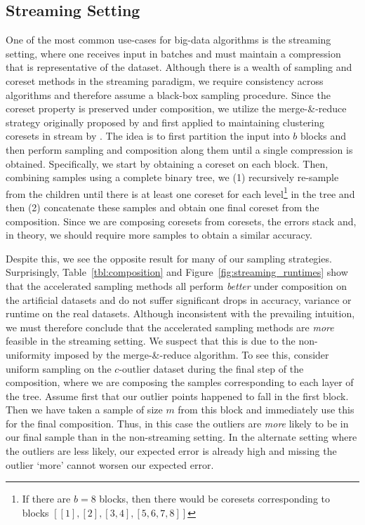 \subsection{Streaming Setting}
\label{ssec:streaming}



One of the most common use-cases for big-data algorithms is the streaming setting, where one receives input in batches and must maintain a compression that is
representative of the dataset. Although there is a wealth of sampling and coreset methods in the streaming paradigm, we require consistency across algorithms
and therefore assume a black-box sampling procedure. Since the coreset property is preserved under composition, we utilize the merge-\&-reduce strategy
originally proposed by \cite{BS80} and first applied to maintaining clustering coresets in stream by \cite{HaM04}. The idea is to first partition the input into
$b$ blocks and then perform sampling and composition along them until a single compression is obtained. Specifically, we start by obtaining a coreset on each
block. Then, combining samples using a complete binary tree, we (1) recursively re-sample from the children until there is at least one coreset for each
level\footnote{If there are $b=8$ blocks, then there would be coresets corresponding to blocks $[[1], [2], [3, 4], [5, 6, 7, 8]]$} in the tree and then (2)
concatenate these samples and obtain one final coreset from the composition. Since we are composing coresets from coresets, the errors stack and, in theory, we
should require more samples to obtain a similar accuracy.

Despite this, we see the opposite result for many of our sampling strategies. Surprisingly, Table~\ref{tbl:composition} and Figure~\ref{fig:streaming_runtimes}
show that the accelerated sampling methods all perform \emph{better} under composition on the artificial datasets and do not suffer significant drops in
accuracy, variance or runtime on the real datasets. Although inconsistent with the prevailing intuition, we must therefore conclude that the accelerated
sampling methods are \emph{more} feasible in the streaming setting.  We suspect that this is due to the non-uniformity imposed by the merge-\&-reduce algorithm.
To see this, consider uniform sampling on the $c$-outlier dataset during the final step of the composition, where we are composing the samples corresponding to
each layer of the tree. Assume first that our outlier points happened to fall in the first block. Then we have taken a sample of size $m$ from this block and
immediately use this for the final composition. Thus, in this case the outliers are \emph{more} likely to be in our final sample than in the non-streaming
setting. In the alternate setting where the outliers are less likely, our expected error is already high and missing the outlier `more' cannot worsen our
expected error. 


